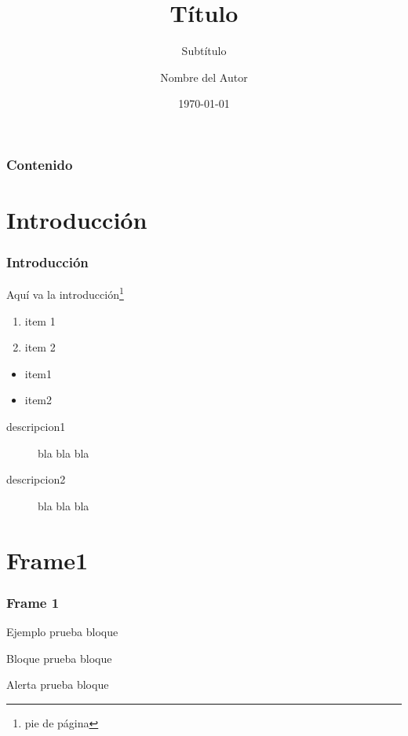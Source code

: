 \documentclass[]{beamer}
\title{Título}
\subtitle{Subtítulo}
\author{Nombre del Autor}
\institute{Pontificia Universidad Javeriana}
\date{\today}
\begin{document}
\begin{frame}[t,plain]
  	\titlepage
\end{frame}

\begin{frame}
	\frametitle{Contenido}
	\tableofcontents
\end{frame}

\section{Introducción}
\begin{frame}
  \frametitle{Introducción}
  
  Aquí va la \alert{introducción\footnote{pie de página}}
  
  \begin{enumerate}
	\item item 1
  	\item item 2
  \end{enumerate}
  
  \begin{itemize}
  	\item item1 
    \item item2 
  \end{itemize}

  \begin{description}
  	\item[descripcion1] bla bla bla
  	\item[descripcion2] bla bla bla 
  \end{description}
\end{frame}

\section{Frame1}
\begin{frame}
	\frametitle{Frame 1}
 
    \begin{exampleblock}{Ejemplo}
    	prueba bloque
  	\end{exampleblock}

  	\begin{block}{Bloque}
    	prueba bloque
  	\end{block}

  	\begin{alertblock}{Alerta}
    	prueba bloque
  	\end{alertblock}
\end{frame}
\end{document}
